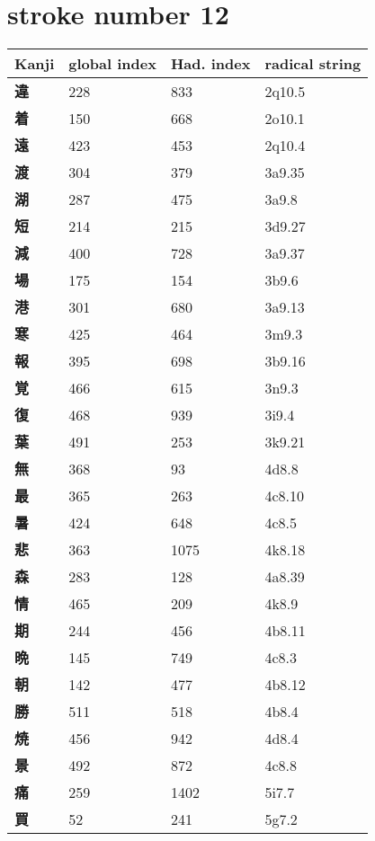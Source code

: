 \section{stroke number 12}
  \begin{longtable}[c]{llll}
    \bfseries Kanji & \bfseries global index & \bfseries Had. index & \bfseries radical string\\\hline\endhead
    \bfseries 違 & 228 & 833 & 2q10.5\\
    \bfseries 着 & 150 & 668 & 2o10.1\\
    \bfseries 遠 & 423 & 453 & 2q10.4\\
    \bfseries 渡 & 304 & 379 & 3a9.35\\
    \bfseries 湖 & 287 & 475 & 3a9.8\\
    \bfseries 短 & 214 & 215 & 3d9.27\\
    \bfseries 減 & 400 & 728 & 3a9.37\\
    \bfseries 場 & 175 & 154 & 3b9.6\\
    \bfseries 港 & 301 & 680 & 3a9.13\\
    \bfseries 寒 & 425 & 464 & 3m9.3\\
    \bfseries 報 & 395 & 698 & 3b9.16\\
    \bfseries 覚 & 466 & 615 & 3n9.3\\
    \bfseries 復 & 468 & 939 & 3i9.4\\
    \bfseries 葉 & 491 & 253 & 3k9.21\\
    \bfseries 無 & 368 & 93 & 4d8.8\\
    \bfseries 最 & 365 & 263 & 4c8.10\\
    \bfseries 暑 & 424 & 648 & 4c8.5\\
    \bfseries 悲 & 363 & 1075 & 4k8.18\\
    \bfseries 森 & 283 & 128 & 4a8.39\\
    \bfseries 情 & 465 & 209 & 4k8.9\\
    \bfseries 期 & 244 & 456 & 4b8.11\\
    \bfseries 晩 & 145 & 749 & 4c8.3\\
    \bfseries 朝 & 142 & 477 & 4b8.12\\
    \bfseries 勝 & 511 & 518 & 4b8.4\\
    \bfseries 焼 & 456 & 942 & 4d8.4\\
    \bfseries 景 & 492 & 872 & 4c8.8\\
    \bfseries 痛 & 259 & 1402 & 5i7.7\\
    \bfseries 買 & 52 & 241 & 5g7.2\\

\end{longtable}
